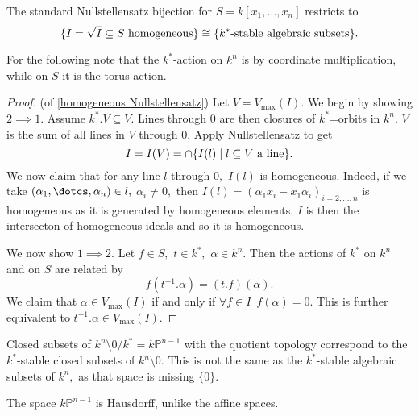 \begin{corollary}
  The standard Nullstellensatz bijection for \(S = k[x_1, \dotsc, x_n]\) restricts to
  \[\{I = \sqrt{I} \subseteq S \text{ homogeneous}\} \cong \{k^*\text{-stable algebraic subsets}\}.\]
\end{corollary}


For the following note that the \(k^*\)-action on \(k^n\) is by coordinate multiplication, while on \(S\) it is the torus action.

\begin{proof}(of \cref{homogeneous Nullstellensatz})
  Let \(V = V_{\text{max}}(I).\) We begin by showing \(2 \implies 1.\) Assume \(k^*. V \subseteq V.\) Lines through \(0\) are then closures of \(k^*\)=orbits in \(k^n.\) \(V\) is the sum of all lines in \(V\) through \(0.\) Apply Nullstellensatz to get
  \[I = I(V) = \cap \{I(l) \mathrel{|} l \subseteq V \text{ a line}\}.\]
  We now claim that for any line \(l\) through \(0,\) \(I(l)\) is homogeneous. Indeed, if we take \((\alpha_1, \dotcs, \alpha_n) \in l,\) \(\alpha_i \neq 0,\) then
  \(I(l) = (\alpha_1 x_i - x_1 \alpha_i)_{i = 2, \dotsc, n}\)
  is homogeneous as it is generated by homogeneous elements.
  \(I\) is then the intersecton of homogeneous ideals and so it is homogeneous.

  We now show \(1 \implies 2.\) Let \(f \in S,\) \(t \in k^*,\) \(\alpha \in k^n\). Then the actions of \(k^*\) on \(k^n\) and on \(S\) are related by
  \[f(t^{-1}.\alpha) = (t.f)(\alpha).\]
  We claim that \(\alpha \in V_{\text{max}}(I)\) if and only if \(\forall f \in I \enspace f(\alpha) = 0.\)
  This is further equivalent to
  \(t^{-1}.\alpha \in V_{\text{max}}(I).\)
\end{proof}

\begin{note}
  Closed subsets of \(k^n \setminus 0 /{k^*} = k \mathbb P^{n-1}\) with the quotient topology correspond to the \(k^*\)-stable closed subsets of \(k^n \setminus 0.\) This is not the same as the \(k^*\)-stable algebraic subsets of \(k^n,\) as that space is missing \(\{0\}.\)

  The space \(k \mathbb P^{n-1}\) is Hausdorff, unlike the affine spaces.
\end{note}

















